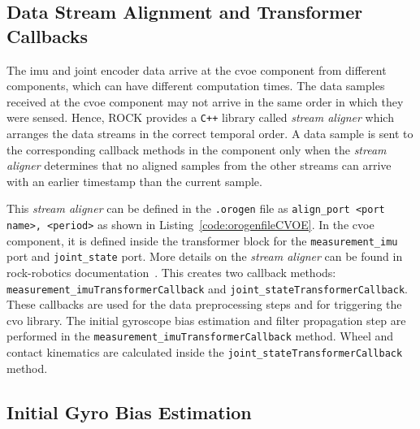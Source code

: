 \documentclass[report.tex]{subfiles}
\begin{document}
    \subsection{Data Stream Alignment and Transformer Callbacks} \label{subsec:StreamAlignerandTransformerCallbacks}

    The \gls{imu} and joint encoder data arrive at the \gls{cvoe} component from different components, which can have different computation times. The data samples received at the \gls{cvoe} component may not arrive in the same order in which they were sensed. Hence, ROCK provides a \texttt{C++} library called \textit{stream aligner} which arranges the data streams in the correct temporal order. A data sample is sent to the corresponding callback methods in the component only when the \textit{stream aligner} determines that no aligned samples from the other streams can arrive with an earlier timestamp than the current sample. 

    This \textit{stream aligner} can be defined in the \texttt{.orogen} file as \verb|align_port <port name>, <period>| as shown in Listing~\ref{code:orogenfileCVOE}. In the \gls{cvoe} component, it is defined inside the transformer block for the \texttt{measurement\_imu} port and \texttt{joint\_state} port. More details on the \textit{stream aligner} can be found in rock-robotics documentation~\cite{SW-rockrobotics}. This creates two callback methods: \texttt{measurement\_imuTransformerCallback} and \texttt{joint\_stateTransformerCallback}. These callbacks are used for the data preprocessing steps and for triggering the \gls{cvo} library. The initial gyroscope bias estimation and filter propagation step are performed in the \texttt{measurement\_imuTransformerCallback} method. Wheel and contact kinematics are calculated inside the \texttt{joint\_stateTransformerCallback} method.     

    \subsection{Initial Gyro Bias Estimation}
\end{document}
